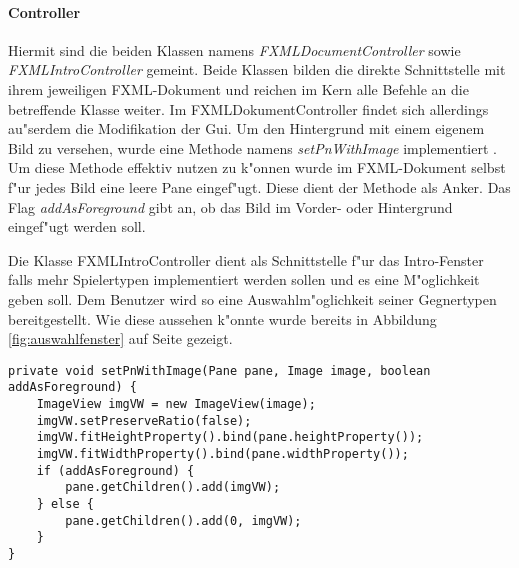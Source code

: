 \paragraph{Controller}
\label{par:controller}
Hiermit sind die beiden Klassen namens \emph{FXMLDocumentController} sowie \emph{FXMLIntroController} gemeint. Beide Klassen bilden die direkte Schnittstelle mit ihrem jeweiligen FXML-Dokument und reichen im Kern alle Befehle an die betreffende Klasse weiter. Im FXMLDokumentController findet sich allerdings au"serdem die Modifikation der Gui. Um den Hintergrund mit einem eigenem Bild zu versehen, wurde eine Methode namens \emph{setPnWithImage} implementiert . Um diese Methode effektiv nutzen zu k"onnen wurde im FXML-Dokument selbst f"ur jedes Bild eine leere Pane eingef"ugt. Diese dient der Methode als Anker. Das Flag \emph{addAsForeground} gibt an, ob das Bild im Vorder- oder Hintergrund eingef"ugt werden soll. 

Die Klasse FXMLIntroController dient als Schnittstelle f"ur das Intro-Fenster falls mehr Spielertypen implementiert werden sollen und es eine M"oglichkeit geben soll. Dem Benutzer wird so eine Auswahlm"oglichkeit seiner Gegnertypen bereitgestellt. Wie diese aussehen k"onnte wurde bereits in Abbildung \ref{fig:auswahlfenster} auf Seite \pageref{fig:auswahlfenster} gezeigt. 

\begin{lstlisting}[float,style=CodeHighlighting,caption=FXMLDocumentController - setPnWithImage,label=lst:fxmlDocumentController_setPnWithImage]
private void setPnWithImage(Pane pane, Image image, boolean addAsForeground) {
    ImageView imgVW = new ImageView(image);
    imgVW.setPreserveRatio(false);
    imgVW.fitHeightProperty().bind(pane.heightProperty());
    imgVW.fitWidthProperty().bind(pane.widthProperty());
    if (addAsForeground) {
        pane.getChildren().add(imgVW);
    } else {
        pane.getChildren().add(0, imgVW);
    }
}
\end{lstlisting}